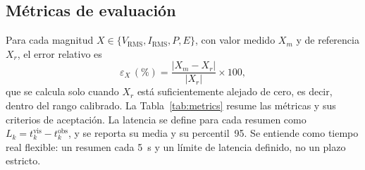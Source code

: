 \subsection{Métricas de evaluación}
\label{sec:metrics}
Para cada magnitud $X\in\{V_{\mathrm{RMS}},I_{\mathrm{RMS}},P,E\}$, con valor medido $X_m$ y de referencia $X_r$, el error relativo es
\begin{equation}
\varepsilon_{X}\,(\%)=\frac{|X_m-X_r|}{|X_r|}\times100,
\label{eq:error}
\end{equation}
que se calcula solo cuando $X_r$ está suficientemente alejado de cero, es decir, dentro del rango calibrado.
La Tabla~\ref{tab:metrics} resume las métricas y sus criterios de aceptación.
La latencia se define para cada resumen como $L_k=t_k^{\mathrm{vis}}-t_k^{\mathrm{obs}}$, y se reporta su media y su percentil~95.
Se entiende como tiempo real flexible: un resumen cada \SI{5}{s} y un límite de latencia definido, no un plazo estricto.

